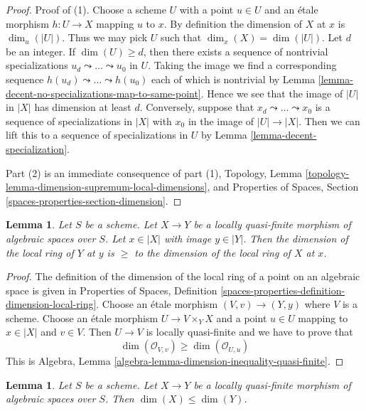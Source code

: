 \documentclass{stacks-project}
\theoremstyle{plain}
\newtheorem{lemma}[subsection]{Lemma}
\theoremstyle{definition}
\theoremstyle{remark}
\numberwithin{equation}{subsection}
\begin{document}
\begin{proof}
Proof of (1). Choose a scheme $U$ with a point $u \in U$
and an \'etale morphism $h : U \to X$ mapping $u$ to $x$.
By definition the dimension of $X$ at $x$ is $\dim_u(|U|)$.
Thus we may pick $U$ such that $\dim_x(X) = \dim(|U|)$.
Let $d$ be an integer. If $\dim(U) \geq d$, then
there exists a sequence of nontrivial specializations
$u_d \leadsto \ldots \leadsto u_0$ in $U$. Taking the image
we find a corresponding sequence
$h(u_d) \leadsto \ldots \leadsto h(u_0)$
each of which is nontrivial by
Lemma \ref{lemma-decent-no-specializations-map-to-same-point}.
Hence we see that the image of $|U|$ in $|X|$ has dimension at least $d$.
Conversely, suppose that $x_d \leadsto \ldots \leadsto x_0$ is a
sequence of specializations in $|X|$ with $x_0$ in the image of
$|U| \to |X|$. Then we can lift this to a sequence of specializations
in $U$ by Lemma \ref{lemma-decent-specialization}.

\medskip\noindent
Part (2) is an immediate consequence of part (1),
Topology, Lemma \ref{topology-lemma-dimension-supremum-local-dimensions},
and Properties of Spaces, Section \ref{spaces-properties-section-dimension}.
\end{proof}

\begin{lemma}
\label{lemma-dimension-local-ring-quasi-finite}
Let $S$ be a scheme. Let $X \to Y$ be a locally quasi-finite morphism
of algebraic spaces over $S$. Let $x \in |X|$ with image $y \in |Y|$.
Then the dimension of the local ring of $Y$ at $y$ is $\geq$ to the
dimension of the local ring of $X$ at $x$.
\end{lemma}

\begin{proof}
The definition of the dimension of the local ring of a point on an
algebraic space is given in Properties of Spaces, Definition
\ref{spaces-properties-definition-dimension-local-ring}.
Choose an \'etale morphism $(V, v) \to (Y, y)$ where $V$ is a scheme.
Choose an \'etale morphism $U \to V \times_Y X$ and a point $u \in U$
mapping to $x \in |X|$ and $v \in V$. Then $U \to V$ is locally
quasi-finite and we have to prove that
$$
\dim(\mathcal{O}_{V, v}) \geq \dim(\mathcal{O}_{U, u})
$$
This is Algebra, Lemma \ref{algebra-lemma-dimension-inequality-quasi-finite}.
\end{proof}

\begin{lemma}
\label{lemma-dimension-quasi-finite}
Let $S$ be a scheme. Let $X \to Y$ be a locally quasi-finite morphism
of algebraic spaces over $S$. Then $\dim(X) \leq \dim(Y)$.
\end{lemma}
\end{document}

